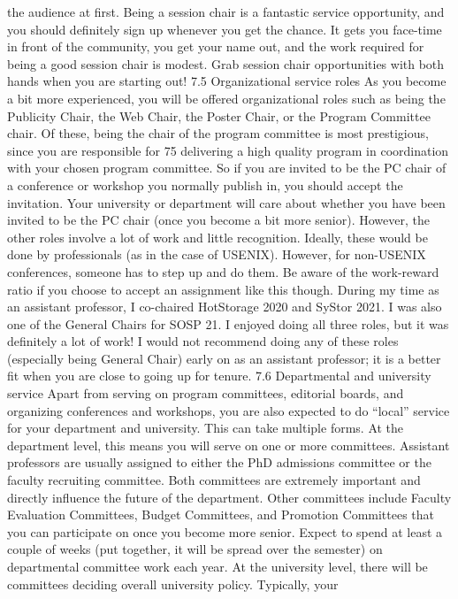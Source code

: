 \documentclass[oneside,11pt]{memoir}
\begin{document}
the audience at first.
Being a session chair is a fantastic service opportunity, and you should definitely sign up
whenever you get the chance. It gets you face-time in front of the community, you get your name
out, and the work required for being a good session chair is modest. Grab session chair
opportunities with both hands when you are starting out!
7.5 Organizational service roles
As you become a bit more experienced, you will be offered organizational roles such as being
the Publicity Chair, the Web Chair, the Poster Chair, or the Program Committee chair. Of these,
being the chair of the program committee is most prestigious, since you are responsible for
75
delivering a high quality program in coordination with your chosen program committee. So if you
are invited to be the PC chair of a conference or workshop you normally publish in, you should
accept the invitation. Your university or department will care about whether you have been
invited to be the PC chair (once you become a bit more senior).
However, the other roles involve a lot of work and little recognition. Ideally, these would be done
by professionals (as in the case of USENIX). However, for non-USENIX conferences, someone
has to step up and do them. Be aware of the work-reward ratio if you choose to accept an
assignment like this though.
During my time as an assistant professor, I co-chaired HotStorage 2020 and SyStor 2021. I was
also one of the General Chairs for SOSP 21. I enjoyed doing all three roles, but it was definitely a
lot of work! I would not recommend doing any of these roles (especially being General Chair)
early on as an assistant professor; it is a better fit when you are close to going up for tenure.
7.6 Departmental and university service
Apart from serving on program committees, editorial boards, and organizing conferences and
workshops, you are also expected to do “local” service for your department and university. This
can take multiple forms.
At the department level, this means you will serve on one or more committees. Assistant
professors are usually assigned to either the PhD admissions committee or the faculty
recruiting committee. Both committees are extremely important and directly influence the future
of the department. Other committees include Faculty Evaluation Committees, Budget
Committees, and Promotion Committees that you can participate on once you become more
senior. Expect to spend at least a couple of weeks (put together, it will be spread over the
semester) on departmental committee work each year.
At the university level, there will be committees deciding overall university policy. Typically, your
\end{document}

